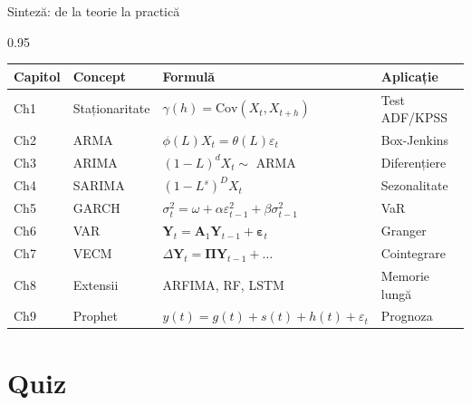 \documentclass[9pt, aspectratio=169, t]{beamer}
\begin{document}
\begin{frame}{Sinteză: de la teorie la practică}
    \begin{cminipage}{0.95\textwidth}
        {\tiny
        \begin{center}
        \begin{tabular}{@{}l l l l@{}}
            \toprule
            \textbf{Capitol} & \textbf{Concept} & \textbf{Formulă} & \textbf{Aplicație} \\
            \midrule
            Ch1 & Staționaritate & $\gamma(h) = \text{Cov}(X_t, X_{t+h})$ & Test ADF/KPSS \\
            Ch2 & ARMA & $\phi(L)X_t = \theta(L)\varepsilon_t$ & Box-Jenkins \\
            Ch3 & ARIMA & $(1-L)^d X_t \sim$ ARMA & Diferențiere \\
            Ch4 & SARIMA & $(1-L^s)^D X_t$ & Sezonalitate \\
            Ch5 & GARCH & $\sigma_t^2 = \omega + \alpha\varepsilon_{t-1}^2 + \beta\sigma_{t-1}^2$ & VaR \\
            Ch6 & VAR & $\mathbf{Y}_t = \mathbf{A}_1\mathbf{Y}_{t-1} + \boldsymbol{\varepsilon}_t$ & Granger \\
            Ch7 & VECM & $\Delta\mathbf{Y}_t = \boldsymbol{\Pi}\mathbf{Y}_{t-1} + \ldots$ & Cointegrare \\
            Ch8 & Extensii & ARFIMA, RF, LSTM & Memorie lungă \\
            Ch9 & Prophet & $y(t) = g(t) + s(t) + h(t) + \varepsilon_t$ & Prognoza \\
            \bottomrule
        \end{tabular}
        \end{center}
        }
    \end{cminipage}
\end{frame}

\section{Quiz}
\end{document}
